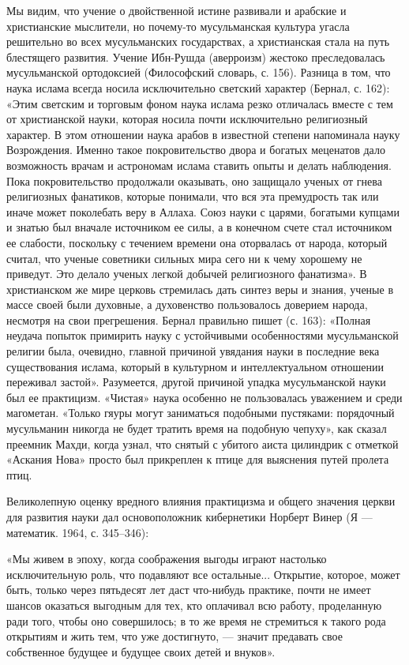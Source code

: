 Мы видим, что учение о двойственной истине развивали и арабские и
христианские мыслители, но почему-то мусульманская культура угасла
решительно во всех мусульманских государствах, а христианская стала на путь
блестящего развития. Учение Ибн-Рушда (аверроизм) жестоко преследовалась
мусульманской ортодоксией (Философский словарь, с. 156). Разница в том, что
наука ислама всегда носила исключительно светский характер (Бернал, с.
162): «Этим светским и торговым фоном наука ислама резко отличалась вместе с
тем от христианской науки, которая носила почти исключительно религиозный
характер. В этом отношении наука арабов в известной степени напоминала
науку Возрождения. Именно такое покровительство двора и богатых меценатов
дало возможность врачам и астрономам ислама ставить опыты и делать
наблюдения. Пока покровительство продолжали оказывать, оно защищало ученых от
гнева религиозных фанатиков, которые понимали, что вся эта премудрость так или
иначе может поколебать веру в Аллаха. Союз науки с царями, богатыми купцами и
знатью был вначале источником ее силы, а в конечном счете стал источником ее
слабости, поскольку с течением времени она оторвалась
от народа, который считал, что ученые советники сильных мира сего ни к чему
хорошему не приведут. Это делало ученых легкой добычей религиозного
фанатизма». В христианском же мире церковь стремилась дать синтез веры и
знания, ученые в массе своей были духовные, а духовенство пользовалось
доверием народа, несмотря на свои прегрешения. Бернал правильно пишет (с.
163): «Полная неудача попыток примирить науку с устойчивыми особенностями
мусульманской религии была, очевидно, главной причиной увядания науки в
последние века существования ислама, который в культурном и
интеллектуальном отношении переживал застой». Разумеется, другой причиной
упадка мусульманской науки был ее практицизм. «Чистая» наука особенно не
пользовалась уважением и среди магометан. «Только гяуры могут заниматься
подобными пустяками: порядочный мусульманин никогда не будет тратить время на
подобную чепуху», как сказал преемник Махди, когда узнал, что снятый с
убитого аиста цилиндрик с отметкой «Аскания Нова» просто был прикреплен к
птице для выяснения путей пролета птиц.

Великолепную оценку вредного влияния практицизма и общего значения церкви для
развития науки дал основоположник кибернетики Норберт Винер (Я --- математик.
1964, с. 345--346):

«Мы живем в эпоху, когда соображения выгоды играют настолько исключительную
роль, что подавляют все остальные... Открытие, которое, может быть, только
через пятьдесят лет даст что-нибудь практике, почти не имеет шансов
оказаться выгодным для тех, кто оплачивал всю работу, проделанную ради
того, чтобы оно совершилось; в то же время не стремиться к такого рода
открытиям и жить тем, что уже достигнуто, --- значит предавать свое
собственное будущее и будущее своих детей и внуков».

